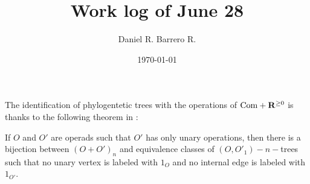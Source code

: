 \documentclass{amsart}
\title{Work log of June 28}
\author{Daniel R. Barrero R.}
\date{\today}
\begin{document}
\maketitle

\section{}

The identification of phylogentetic trees with the operations of
$\mathrm{Com} + \mathbf{R}^{\geq 0}$ is thanks to the following theorem in
\cite{baezOtter}:

\begin{thm}
	If $O$ and $O'$ are operads such that $O'$ has only unary
	operations, then there is a bijection between $(O + O')_n$ and
	equivalence classes of $(O,O'_1)-n-$trees such that no unary vertex
	is labeled with $1_O$ and no internal edge is labeled with
	$1_{O'}$.
\end{thm}



\end{document}
